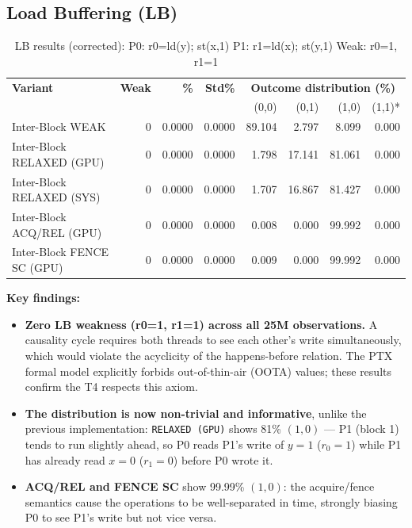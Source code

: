 \documentclass[a4paper]{article}
\begin{document}
\subsection{Load Buffering (LB)}

\begin{table}[H]
\centering
\small
\caption{LB results (corrected): P0: r0=ld(y); st(x,1) \quad P1: r1=ld(x); st(y,1) \quad Weak: r0=1, r1=1}
\label{tab:lb-results}
\begin{tabular}{l|r r r | r r r r}
\toprule
\textbf{Variant} & \textbf{Weak} & \textbf{\%} & \textbf{Std\%} & \multicolumn{4}{c}{\textbf{Outcome distribution (\%)}} \\
                 &               &             &                & (0,0) & (0,1) & (1,0) & (1,1)* \\
\midrule
Inter-Block WEAK          & 0 & 0.0000 & 0.0000 & 89.104 &  2.797 &  8.099 & 0.000 \\
Inter-Block RELAXED (GPU) & 0 & 0.0000 & 0.0000 &  1.798 & 17.141 & 81.061 & 0.000 \\
Inter-Block RELAXED (SYS) & 0 & 0.0000 & 0.0000 &  1.707 & 16.867 & 81.427 & 0.000 \\
Inter-Block ACQ/REL (GPU) & 0 & 0.0000 & 0.0000 &  0.008 &  0.000 & 99.992 & 0.000 \\
Inter-Block FENCE SC (GPU)& 0 & 0.0000 & 0.0000 &  0.009 &  0.000 & 99.992 & 0.000 \\
\bottomrule
\end{tabular}
\end{table}

\textbf{Key findings:}
\begin{itemize}
  \item \textbf{Zero LB weakness (r0=1, r1=1) across all 25M observations.}
    A causality cycle requires both threads to see each other's write simultaneously, which would violate the acyclicity of the happens-before relation. The PTX formal model \cite{Lustig2019PTX} explicitly forbids out-of-thin-air (OOTA) values; these results confirm the T4 respects this axiom.
  \item \textbf{The distribution is now non-trivial and informative}, unlike the previous implementation:
    \texttt{RELAXED (GPU)} shows 81\% $(1,0)$ — P1 (block 1) tends to run slightly ahead, so P0 reads P1's write of $y=1$ ($r_0=1$) while P1 has already read $x=0$ ($r_1=0$) before P0 wrote it.
  \item \textbf{ACQ/REL and FENCE SC} show 99.99\% $(1,0)$: the acquire/fence semantics cause the operations to be well-separated in time, strongly biasing P0 to see P1's write but not vice versa.
\end{itemize}
\end{document}
